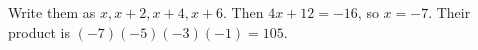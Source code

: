 Write them as $x,x+2,x+4,x+6$. Then $4x+12=-16$, so $x=-7$. Their product is $(-7)(-5)(-3)(-1)=\boxed{105}$.
